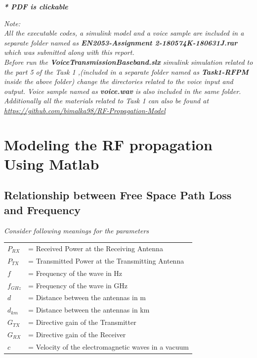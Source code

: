 \documentclass[a4paper,11pt]{article}%
\begin{document}

\tableofcontents

\begin{center}
	\textbf{\textit{* PDF is clickable}}
\end{center}



\textit{Note:}\\

\textit{All the executable codes, a simulink model and a voice sample are included in a separate folder named as \textbf{EN2053-Assignment 2-180574K-180631J.rar} which was submitted along with this report.}\\

\textit{Before run the \textbf{VoiceTransmissionBaseband.slx} simulink simulation related to the part 5 of the Task 1 ,(included in a separate folder named as \textbf{Task1-RFPM} inside the above folder) change the directories related to the voice input and output. Voice sample named as \textbf{voice.wav} is also included in the same folder.}\\ 

\textit{Additionally all the materials related to Task 1 can also be found at \url{https://github.com/bimalka98/RF-Propagation-Model}}



\pagebreak
\section{Modeling the RF propagation Using Matlab}
\subsection{Relationship between Free Space Path Loss and Frequency}

\textit{Consider  following meanings for the parameters}\\

\begin{tabular}{l l }
	$P_{RX}$ & = Received Power at the Receiving Antenna\\
	$P_{TX}$ & = Transmitted Power at the Transmitting Antenna\\
	$f$ & = Frequency of the wave in Hz\\
	$f_{GHz}$ & = Frequency of the wave in GHz\\
	$d$& = Distance between the antennas in m\\
	$d_{km}$& = Distance between the antennas in km\\
	$G_{TX}$& = Directive gain of the Transmitter\\
	$G_{RX}$& = Directive gain of the Receiver\\
	$c$& = Velocity of the electromagnetic waves in a vacuum\\

\end{tabular}\\[1cm]
\end{document}

